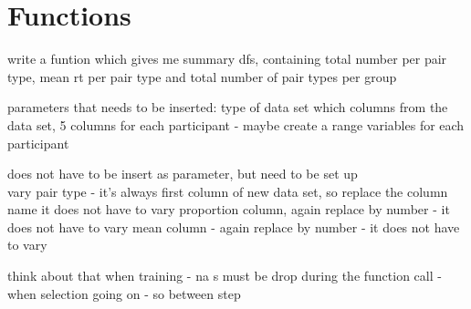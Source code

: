 \documentclass[]{article}
\newenvironment{Shaded}{\begin{snugshade}}{\end{snugshade}}
\newcommand{\KeywordTok}[1]{\textcolor[rgb]{0.13,0.29,0.53}{\textbf{#1}}}
\newcommand{\StringTok}[1]{\textcolor[rgb]{0.31,0.60,0.02}{#1}}
\newcommand{\CommentTok}[1]{\textcolor[rgb]{0.56,0.35,0.01}{\textit{#1}}}
\newcommand{\OperatorTok}[1]{\textcolor[rgb]{0.81,0.36,0.00}{\textbf{#1}}}
\newcommand{\NormalTok}[1]{#1}
\begin{document}
\begin{Shaded}
\end{Shaded}

\begin{Shaded}
\end{Shaded}

\section{Functions}\label{functions}

write a funtion which gives me summary dfs, containing total number per
pair type, mean rt per pair type and total number of pair types per
group

parameters that needs to be inserted: type of data set which columns
from the data set, 5 columns for each participant - maybe create a range
variables for each participant

does not have to be insert as parameter, but need to be set up\\
vary pair type - it's always first column of new data set, so replace
the column name it does not have to vary proportion column, again
replace by number - it does not have to vary mean column - again replace
by number - it does not have to vary

think about that when training - na s must be drop during the function
call - when selection going on - so between step
\end{document}
